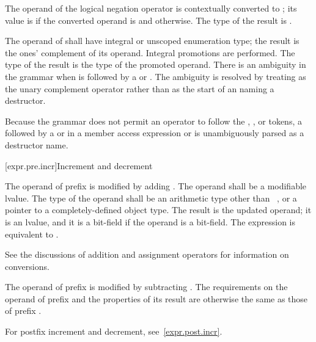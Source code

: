 \pnum
{}%
The operand of the logical negation operator \tcode{!} is contextually
converted to ;
its value is 
if the converted operand is  and  otherwise.
The type of the result is .

\pnum
{}%
%
The operand of \tcode{\~{}} shall have integral or unscoped enumeration type; the
result is the ones' complement of its operand. Integral promotions are
performed. The type of the result is the type of the promoted operand.
There is an ambiguity
in the grammar when \tcode{\~{}} is followed by
a  or .
The ambiguity is resolved by treating \tcode{\~{}} as the unary complement
operator rather than as the start of an 
naming a destructor.
\begin{note}
Because the grammar does not permit an operator to follow the
, \tcode{->}, or \tcode{::} tokens, a \tcode{\~{}} followed by
a  or  in a
member access expression or  is
unambiguously parsed as a destructor name.
\end{note}

[expr.pre.incr]{Increment and decrement}

\pnum
{}%
%
The operand of prefix \tcode{++}
%
%
is modified by adding .
%
The operand shall be a modifiable lvalue. The type of the operand shall
be an arithmetic type other than \cv{}~,
or a pointer to a completely-defined object type.
The result is the updated operand; it is an lvalue, and it is a
bit-field if the operand is a bit-field.
The expression  is equivalent to .
%
\begin{note}
See the discussions of addition and assignment
operators for information on conversions.
\end{note}

\pnum
The operand of prefix
%
\tcode{\dcr} is modified by subtracting .
The requirements on the operand of prefix
\tcode{\dcr} and the properties of its result are otherwise the same as
those of prefix \tcode{++}.
\begin{note}
For postfix increment and decrement, see~\ref{expr.post.incr}.
\end{note}

